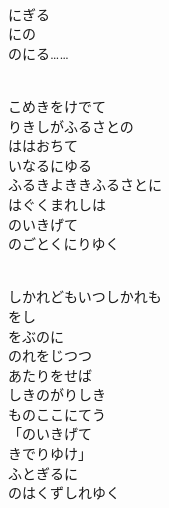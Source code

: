 \documentclass[10pt,b5j]{tarticle} %
\begin{document}
\vspace{1.5em} %
\newcommand{\linespace}{0.5em} %
\newcommand{\blocksize}{0.5\hsize} %
\newcommand{\itemmargin}{6em} %
\begin{enumerate} %
    \setlength{\itemindent}{\itemmargin} %
    \begin{minipage}[c]{\blocksize}
    
        \vspace{\linespace}
        \item~\\
        にぎる\\
        にの\\
        のにる……
        
        \vspace{\linespace}
        \item~\\
        こめきをけでて\\
        りきしがふるさとの\\
        ははおちて\\
        いなるにゆる\\
        ふるきよききふるさとに\\
        はぐくまれしは\\
        のいきげて\\
        のごとくにりゆく
        
        \vspace{\linespace}
        \item~\\
        しかれどもいつしかれも\\
        をし\\
        をぶのに\\
        のれをじつつ\\
        あたりをせば\\
        しきのがりしき\\
        ものここにてう\\
        「のいきげて\\
        きでりゆけ」\\
        ふとぎるに\\
        のはくずしれゆく
    
    \end{minipage}
\end{enumerate} %
\end{document}
